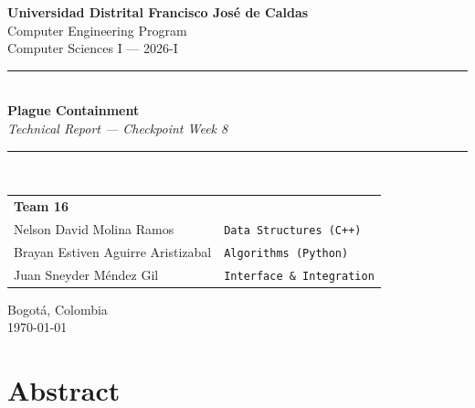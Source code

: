 \documentclass[12pt, a4paper]{article}
\begin{document}
\begin{titlepage}
  \centering
  \vspace*{1.5cm}

  {\Large \textbf{Universidad Distrital Francisco Jos\'{e} de Caldas}}\\[0.4cm]
  {\large Computer Engineering Program}\\[0.4cm]
  {\large Computer Sciences I --- 2026-I}\\[2.0cm]

  \rule{\linewidth}{1.5pt}\\[0.4cm]
  {\Huge \textbf{Plague Containment}}\\[0.3cm]
  {\large \textit{Technical Report --- Checkpoint Week 8}}\\[0.2cm]
  \rule{\linewidth}{1.5pt}\\[2.0cm]

  \begin{tabular}{ll}
    \textbf{Team 16} & \\[0.3cm]
    Nelson David Molina Ramos         & \texttt{Data Structures (C++)}\\[0.2cm]
    Brayan Estiven Aguirre Aristizabal & \texttt{Algorithms (Python)}\\[0.2cm]
    Juan Sneyder M\'{e}ndez Gil        & \texttt{Interface \& Integration}\\
  \end{tabular}

  \vfill
  {\large Bogot\'{a}, Colombia\\[0.2cm] \today}
\end{titlepage}

\newpage
\tableofcontents

\newpage
\listoffigures
\listoftables

\newpage
\section{Abstract}
\end{document}
